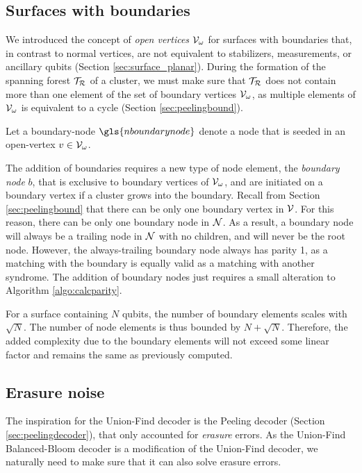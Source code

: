 \subsection{Surfaces with boundaries}\label{sec:ufbbbound}
We introduced the concept of \emph{open vertices} $\mathcal{V}_\omega$ for surfaces with boundaries that, in contrast to normal vertices, are not equivalent to stabilizers, measurements, or ancillary qubits (Section \ref{sec:surface_planar}). During the formation of the spanning forest $\mathcal{T}_{\mathcal{R}}$ of a cluster, we must make sure that $\mathcal{T}_{\mathcal{R}}$ does not contain more than one element of the set of boundary vertices $\mathcal{V}_\omega$, as multiple elements of $\mathcal{V}_\omega$ is equivalent to a cycle (Section \ref{sec:peelingbound}).
\begin{definition}\label{def:boundarynode}
  Let a boundary-node $\gls{nboundarynode}$ denote a node that is seeded in an open-vertex $v \in \mathcal{V}_\omega$. 
\end{definition}
The addition of boundaries requires a new type of node element, the \emph{boundary node} $b$, that is exclusive to boundary vertices of $\mathcal{V}_\omega$, and are initiated on a boundary vertex if a cluster grows into the boundary. Recall from Section \ref{sec:peelingbound} that there can be only one boundary vertex in $\mathcal{V}$. For this reason, there can be only one boundary node in $\mathcal{N}$. As a result, a boundary node will always be a trailing node in $\mathcal{N}$ with no children, and will never be the root node. However, the always-trailing boundary node always has parity 1, as a matching with the boundary is equally valid as a matching with another syndrome. The addition of boundary nodes just requires a small alteration to Algorithm \ref{algo:calcparity}.


For a surface containing $N$ qubits, the number of boundary elements scales with $\sqrt{N}$. The number of node elements is thus bounded by $N + \sqrt{N}$. Therefore, the added complexity due to the boundary elements will not exceed some linear factor and remains the same as previously computed.

\subsection{Erasure noise}\label{sec:ufbberasure}

The inspiration for the Union-Find decoder is the Peeling decoder (Section \ref{sec:peelingdecoder}), that only accounted for \emph{erasure} errors. As the Union-Find Balanced-Bloom decoder is a modification of the Union-Find decoder, we naturally need to make sure that it can also solve erasure errors.

